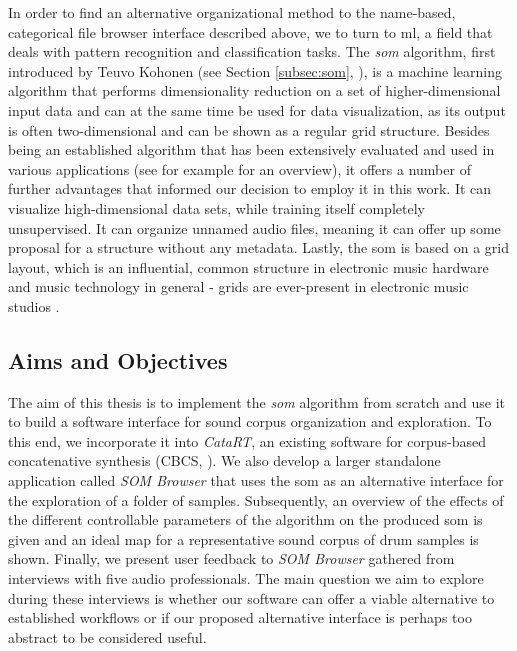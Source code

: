 \smallskip

In order to find an alternative organizational method to the name-based,
categorical file browser interface described above, we to turn to \gls{ml},
a field that deals with pattern recognition and classification tasks. The
\textit{\gls{som}} algorithm, first introduced by Teuvo Kohonen (see Section
\ref{subsec:som}, \citet{kohonen1990}), is a machine learning algorithm that
performs dimensionality reduction on a set of higher-dimensional input data and
can at the same time be used for data visualization, as its output is often
two-dimensional and can be shown as a regular grid structure. Besides being an
established algorithm that has been extensively evaluated and used in various
applications (see for example \citet[p.1476]{kohonen1990} for an overview), it
offers a number of further advantages that informed our decision to employ it
in this work. It can visualize high-dimensional data sets, while training itself
completely unsupervised. It can organize unnamed audio files, meaning it can
offer up some proposal for a structure without any metadata. Lastly, the
\gls{som} is based on a grid layout, which is an influential, common structure
in electronic music hardware and music technology in general - grids are
ever-present in electronic music studios \citep{adeney2009}.


\subsection{Aims and Objectives}
\label{subsec:aims}

The aim of this thesis is to implement the \textit{\gls{som}} algorithm from
scratch and use it to build a software interface for sound corpus organization
and exploration. To this end, we incorporate it into \textit{CataRT}, an
existing software for corpus-based concatenative synthesis (CBCS,
\citet{schwarz2006}). We also develop a larger standalone application called
\textit{SOM Browser} that uses the \gls{som} as an alternative interface for the
exploration of a folder of samples. Subsequently, an overview of the
effects of the different controllable parameters of the algorithm on the
produced \gls{som} is given and an ideal map for a representative sound corpus
of drum samples is shown. Finally, we present user feedback to
\textit{SOM Browser} gathered from interviews with five audio professionals.
The main question we aim to explore during these interviews is whether our
software can offer a viable alternative to established workflows or if our
proposed alternative interface is perhaps too abstract to be considered useful.


